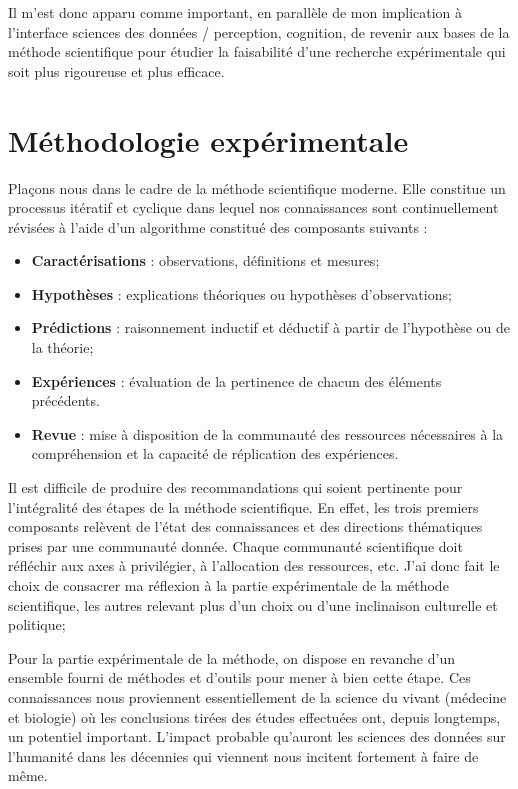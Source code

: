 Il m'est donc apparu comme important, en parallèle de mon implication à l'interface sciences des données / perception, cognition, de revenir aux bases de la méthode scientifique pour étudier la faisabilité d'une recherche expérimentale qui soit plus rigoureuse et plus efficace.

\section{ \nmu Méthodologie expérimentale} \label{sec:xp}

Plaçons nous dans le cadre de la méthode scientifique moderne. Elle constitue un processus itératif et cyclique dans lequel nos connaissances sont continuellement révisées à l'aide d'un algorithme constitué des composants suivants :
\begin{itemize}
  \item \textbf{Caractérisations} : observations, définitions et mesures;
  \item \textbf{Hypothèses} : explications théoriques ou hypothèses d'observations;
  \item \textbf{Prédictions} : raisonnement inductif et déductif à partir de l'hypothèse ou de la théorie;
  \item \textbf{Expériences} : évaluation de la pertinence de chacun des éléments précédents.
  \item \textbf{Revue} : mise à disposition  de la communauté des ressources nécessaires à la compréhension et la capacité de réplication des expériences.
\end{itemize}

Il est difficile de produire des recommandations qui soient pertinente pour l'intégralité des étapes de la méthode scientifique. En effet, les trois premiers composants relèvent de l'état des connaissances et des \og directions \fg thématiques prises par une communauté donnée. Chaque communauté scientifique doit réfléchir aux axes à privilégier, à l'allocation des ressources, etc. J'ai donc fait le choix de consacrer ma réflexion à la partie expérimentale de la méthode scientifique, les autres relevant plus d'un choix ou d'une inclinaison culturelle et politique;%

Pour la partie expérimentale de la méthode, on dispose en revanche d'un ensemble fourni de méthodes et d'outils pour mener à bien cette étape. Ces connaissances nous proviennent essentiellement de la science du vivant (médecine et biologie) où les conclusions tirées des études effectuées ont, depuis longtemps, un potentiel important. L'impact probable qu'auront les sciences des données sur l'humanité dans les décennies qui viennent nous incitent fortement à faire de même.

